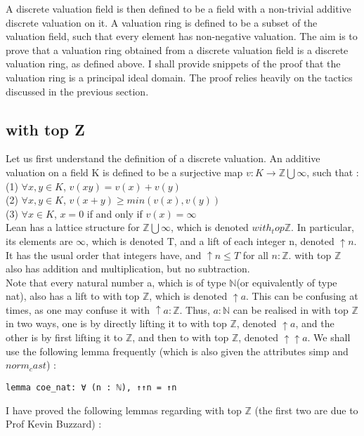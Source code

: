 \documentclass[10pt, a4paper]{article}
\begin{document}
A discrete valuation field is then defined to be a field with a non-trivial additive discrete valuation on it. A valuation ring is defined to be a subset of the valuation field, such that every element has non-negative valuation. The aim is to prove that a valuation ring obtained from a discrete valuation field is a discrete valuation ring, as defined above. I shall provide snippets of the proof that the valuation ring is a principal ideal domain. The proof relies heavily on the tactics discussed in the previous section.

\subsection{with top Z}
Let us first understand the definition of a discrete valuation. An additive valuation on a field K is defined to be a surjective map $ v : K \to \mathbb{Z} \bigcup \infty$, such that : \\
(1) $\forall x, y \in K$, $v(xy) = v(x) + v(y)$ \\
(2) $\forall x, y \in K$, $v(x+y) \geq min(v(x), v(y))$ \\
(3) $\forall x \in K$, $x = 0$ if and only if $v(x) = \infty$ \\
Lean has a lattice structure for $\mathbb{Z} \bigcup \infty$, which is denoted $with _ top \mathbb{Z}$. In particular, its elements are $\infty$, which is denoted T, and a lift of each integer n, denoted $\uparrow n$. It has the usual order that integers have, and $\uparrow n \leq T$ for all $n : \mathbb{Z}$. with top $\mathbb{Z}$ also has addition and multiplication, but no subtraction. \\ 

Note that every natural number a, which is of type $\mathbb{N}$(or equivalently of type nat), also has a lift to with top $\mathbb{Z}$, which is denoted $\uparrow a$. This can be confusing at times, as one may confuse it with $\uparrow a : \mathbb{Z}$. Thus, $a :\mathbb{N}$ can be realised in with top $\mathbb{Z}$ in two ways, one is by directly lifting it to with top $\mathbb{Z}$, denoted $\uparrow a$, and the other is by first lifting it to $\mathbb{Z}$, and then to with top $\mathbb{Z}$, denoted $\uparrow \uparrow a$. We shall use the following lemma frequently (which is also given the attributes simp and $norm_cast$) : 
\begin{lstlisting}
lemma coe_nat: ∀ (n : ℕ), ↑↑n = ↑n
\end{lstlisting}

I have proved the following lemmas regarding with top $\mathbb{Z}$ (the first two are due to Prof Kevin Buzzard) : 
\end{document}
